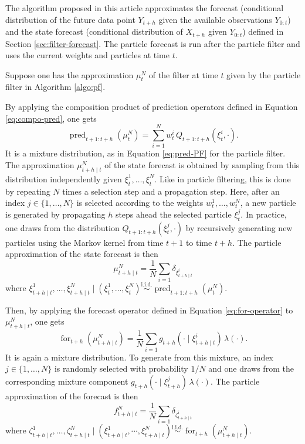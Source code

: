 \documentclass{article}
\newcommand{\simiid}{\overset{\text{i.i.d.}}{\sim}}
\DeclareMathOperator{\pred}{pred}
\DeclareMathOperator{\for}{for}
\begin{document}
The algorithm proposed in this article approximates the forecast (conditional distribution of the future data point $Y_{t+h}$ given the available observations $Y_{0:t}$) and the state forecast (conditional distribution of $X_{t+h}$ given $Y_{0:t}$) defined in Section \ref{sec:filter-forecast}. The particle forecast is run after the particle filter and uses the current weights and particles at time $t$.

Suppose one has the approximation $\mu^N_t$ of the filter at time $t$ given by the particle filter in Algorithm \ref{algo:pf}.

By applying the composition product of prediction operators defined in Equation \eqref{eq:compo-pred}, one gets
\begin{equation}
\label{eq:pred-PFor}
    \pred_{t+1:t+h}(\mu^N_t) = \sum_{i=1}^N w^i_t \, Q_{t+1:t+h}(\xi^i_t,\cdot).
\end{equation}
It is a mixture distribution, as in Equation \eqref{eq:pred-PF} for the particle filter. The approximation $\mu^N_{t+h \mid t}$ of the state forecast is obtained by sampling from this distribution independently given $\xi^1_t,\dots,\xi^N_t$. Like in particle filtering, this is done by repeating $N$ times a selection step and a propagation step. Here, after an index $j \in \{1,\dots,N\}$ is selected according to the weights $w^1_t,\dots,w^N_t$, a new particle is generated by propagating $h$ steps ahead the selected particle $\xi^j_t$. In practice, one draws from the distribution $Q_{t+1:t+h}(\xi^j_t,\cdot)$ by recursively generating new particles using the Markov kernel from time $t+1$ to time $t+h$. The particle approximation of the state forecast is then
\begin{equation*}
    \mu^N_{t+h \mid t} = \frac 1N \sum_{i=1} \delta_{\xi^i_{t+h \mid t}}
\end{equation*}
where $\xi^1_{t+h \mid t},\dots,\xi^N_{t+h \mid t} \mid (\xi^1_t,\dots,\xi^N_t) \simiid \pred_{t+1:t+h}(\mu^N_t)$.

Then, by applying the forecast operator defined in Equation \eqref{eq:for-operator} to $\mu^N_{t+h \mid t}$, one gets
\begin{equation}
\label{eq:forecast-PFor}
    \for_{t+h}(\mu^N_{t+h \mid t}) = \frac 1N \sum_{i=1} g_{t+h}(\cdot \mid \xi^i_{t+h \mid t}) \, \lambda(\cdot).
\end{equation}
It is again a mixture distribution. To generate from this mixture, an index $j \in \{1,\dots,N\}$ is randomly selected with probability $1/N$ and one draws from the corresponding mixture component $g_{t+h}(\cdot \mid \xi^j_{t+h}) \, \lambda(\cdot)$. The particle approximation of the forecast is then
\begin{equation*}
    f^N_{t+h \mid t} = \frac 1N \sum_{i=1} \delta_{\zeta^i_{t+h \mid t}}
\end{equation*}
where $\zeta^1_{t+h \mid t},\dots,\zeta^N_{t+h \mid t} \mid (\xi^1_{t+h \mid t},\cdots,\xi^N_{t+h \mid t}) \simiid \for_{t+h}(\mu^N_{t+h \mid t})$.
\end{document}

